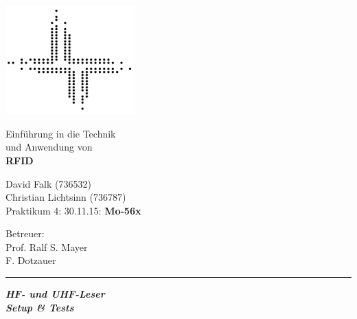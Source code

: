 \documentclass[paper=a4,fontsize=11pt,headsepline,footsepline,parskip=half]{scrartcl}
\begin{document}
\begin{titlepage}

\begin{minipage}[c]{5cm}
\includegraphics[width=5cm]{../logofbi}
\end{minipage}
\hfill
\begin{minipage}[c]{10cm}
\begin{flushright}
\Large Einführung in die Technik\\und Anwendung von\\
\LARGE \textbf{RFID}
\end{flushright}
\end{minipage}

\vspace*{1cm}

\begin{minipage}[c]{9cm}
\begin{flushleft}
\large David Falk (736532)\\Christian Lichtsinn (736787)\\Praktikum 4: 30.11.15: \textbf{Mo-56x}
\end{flushleft}
\end{minipage}
\hfill
\begin{minipage}[c]{7cm}
\begin{flushright}
\large Betreuer:\\Prof. Ralf S. Mayer\\F. Dotzauer
\end{flushright}
\end{minipage}

\vspace*{1cm}

\begingroup
  \setlength{\parskip}{0pt}%
  \setlength{\parindent}{0pt}%
  \setlength{\parfillskip}{0pt plus 1fil}%
  \par\rule{\linewidth}{1.5pt}\par
\endgroup


\centering
\Huge{\textbf{\textsl{HF- und UHF-Leser\\Setup \& Tests}}}


\end{titlepage}
\end{document}
